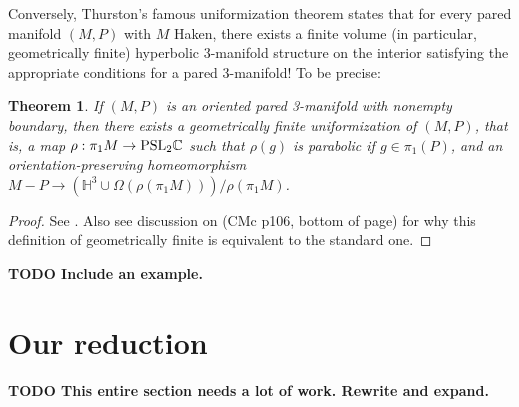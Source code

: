 \documentclass[12pt]{amsart}
\newtheorem{thm}[theorem]{Theorem}
\theoremstyle{definition}
\theoremstyle{remark}
\newcommand{\Om}{\Omega}
\begin{document}
Conversely, Thurston's famous uniformization theorem states that for every
pared manifold $(M,P)$ with $M$ Haken, there exists a finite volume (in
particular, geometrically finite) hyperbolic 3-manifold structure on the
interior satisfying the appropriate conditions for a pared 3-manifold! To be
precise:



\begin{thm}

If $(M,P)$ is an oriented pared 3-manifold with nonempty boundary, then
there exists a geometrically finite uniformization of $(M,P)$, that is, a map
$\rho: \pi_1M \to \mbox{\rm{PSL}}_2\mathbb{C}$ such that $\rho(g)$ is parabolic
if $g \in \pi_1(P)$, and an orientation-preserving homeomorphism $M-P \to
\left(\mathbb{H}^3 \cup \Om(\rho(\pi_1M))\right)/\rho(\pi_1M)$.

\end{thm}
\begin{proof}

See \cite{CMc}.
Also see discussion on (CMc p106, bottom of page) for why this definition of
geometrically finite is equivalent to the standard one.

\end{proof}


{\bf TODO Include an example.}

\section{Our reduction}

{\bf TODO This entire section needs a lot of work. Rewrite and expand.}
\end{document}
